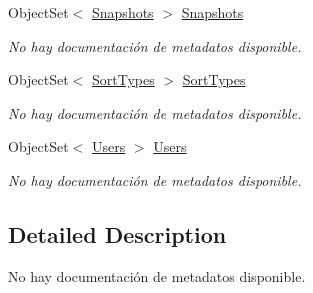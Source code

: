 \begin{DoxyCompactItemize}
Object\-Set$<$ \hyperlink{class_microsoft_1_1_samples_1_1_kinect_1_1_basic_interactions_1_1_snapshots}{Snapshots} $>$ \hyperlink{class_microsoft_1_1_samples_1_1_kinect_1_1_basic_interactions_1_1_o_m_k_t_d_b_entities_a4f50cc9805f80cc32cdf995640c95f3a}{Snapshots}
\begin{DoxyCompactList}\small\item\em No hay documentación de metadatos disponible. \end{DoxyCompactList}\item 
Object\-Set$<$ \hyperlink{class_microsoft_1_1_samples_1_1_kinect_1_1_basic_interactions_1_1_sort_types}{Sort\-Types} $>$ \hyperlink{class_microsoft_1_1_samples_1_1_kinect_1_1_basic_interactions_1_1_o_m_k_t_d_b_entities_ad72072adced5fbf8cce587a54b5ea38f}{Sort\-Types}
\begin{DoxyCompactList}\small\item\em No hay documentación de metadatos disponible. \end{DoxyCompactList}\item 
Object\-Set$<$ \hyperlink{class_microsoft_1_1_samples_1_1_kinect_1_1_basic_interactions_1_1_users}{Users} $>$ \hyperlink{class_microsoft_1_1_samples_1_1_kinect_1_1_basic_interactions_1_1_o_m_k_t_d_b_entities_a5ddaee4df8e84d367f3d47c3b7b689d7}{Users}
\begin{DoxyCompactList}\small\item\em No hay documentación de metadatos disponible. \end{DoxyCompactList}\end{DoxyCompactItemize}


\subsection{Detailed Description}
No hay documentación de metadatos disponible. 



